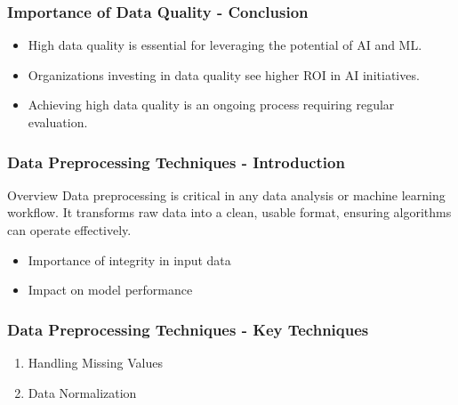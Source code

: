 \documentclass[aspectratio=169]{beamer}
\begin{document}
\begin{frame}[fragile]
    \frametitle{Importance of Data Quality - Conclusion}
    \begin{itemize}
        \item High data quality is essential for leveraging the potential of AI and ML.
        \item Organizations investing in data quality see higher ROI in AI initiatives.
        \item Achieving high data quality is an ongoing process requiring regular evaluation.
    \end{itemize}
\end{frame}

\begin{frame}[fragile]
    \frametitle{Data Preprocessing Techniques - Introduction}
    \begin{block}{Overview}
        Data preprocessing is critical in any data analysis or machine learning workflow. It transforms raw data into a clean, usable format, ensuring algorithms can operate effectively.
    \end{block}
    \begin{itemize}
        \item Importance of integrity in input data
        \item Impact on model performance
    \end{itemize}
\end{frame}

\begin{frame}[fragile]
    \frametitle{Data Preprocessing Techniques - Key Techniques}
    \begin{enumerate}
        \item Handling Missing Values
        \item Data Normalization
    \end{enumerate}
\end{frame}
\end{document}
